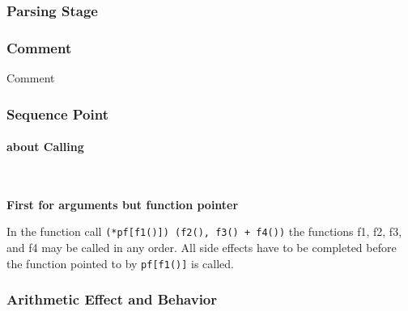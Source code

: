 

\subsubsection{Parsing Stage}



\subsubsection{Comment}

{Comment}



\subsubsection{Sequence Point}



\paragraph{about Calling} \

\textbf{First for arguments but function pointer}

In the function call \verb|(*pf[f1()]) (f2(), f3() + f4())| the functions f1, f2, f3, and f4 may be called in any order. All side effects have to be completed before the function pointed to by \verb|pf[f1()]| is called.



\subsubsection{Arithmetic Effect and Behavior}

